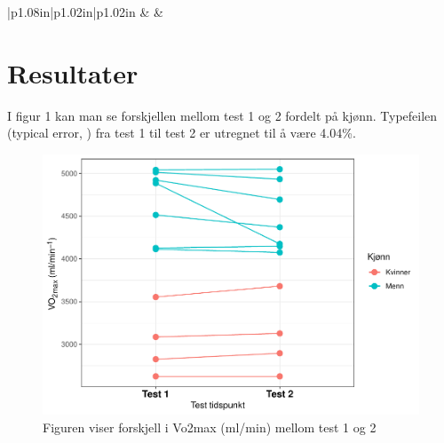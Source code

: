 \documentclass[
]{book}
\begin{document}
\begin{longtable}[c]{|p{1.08in}|p{1.02in}|p{1.02in}}
 &  &  \\

\noalign{\global\setlength{\arrayrulewidth}{2pt}}



\end{longtable}

\hypertarget{resultater}{%
\section{Resultater}\label{resultater}}

I figur 1 kan man se forskjellen mellom test 1 og 2 fordelt på kjønn. Typefeilen (typical error, \citep{hopkins2000}) fra test 1 til test 2 er utregnet til å være 4.04\%.

\begin{figure}
\centering
\includegraphics{_main_files/figure-latex/Figur1-1.pdf}
\caption{\label{fig:Figur1}Figuren viser forskjell i Vo2max (ml/min) mellom test 1 og 2}
\end{figure}
\end{document}
